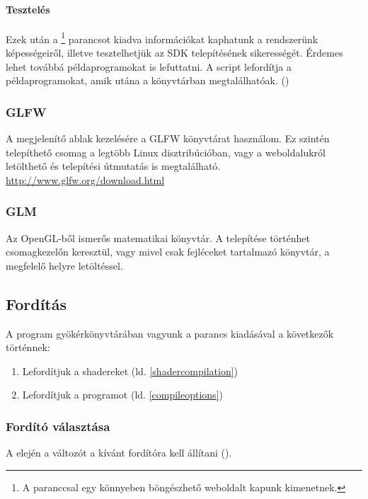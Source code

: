 \paragraph{Tesztel\'es}
Ezek ut\'an a \footnote{A  paranccsal egy k\"onnyeben b\"ong\'eszhet\H o weboldalt kapunk kimenetnek.} parancsot kiadva inform\'aci\'okat kaphatunk a rendszer\"unk k\'epess\'egeir\H ol, illetve tesztelhetj\"uk az SDK telep\'it\'es\'enek sikeress\'eg\'et. 
\'Erdemes lehet tov\'abb\'a p\'eldaprogramokat is lefuttatni. A  script leford\'itja a p\'eldaprogramokat, amik ut\'ana a  k\"onyvt\'arban megtal\'alhat\'oak. ()

\subsubsection{GLFW}
A megjelen\'it\H o ablak kezel\'es\'ere a GLFW k\"onyvt\'arat haszn\'alom. Ez szint\'en telep\'ithet\H o csomag a legt\"obb Linux disztrib\'uci\'oban, vagy a weboldalukr\'ol let\"olthet\H o \'es telep\'it\'esi \'utmutat\'as is megtal\'alhat\'o. \url{http://www.glfw.org/download.html}

\subsubsection{GLM}
Az OpenGL-b\H ol ismer\H os matematikai k\"onyvt\'ar. 
A telep\'it\'ese t\"ort\'enhet csomagkezel\H on kereszt\"ul, vagy mivel csak fejl\'eceket tartalmaz\'o k\"onyvt\'ar, a megfelel\H o helyre let\"olt\'essel.

\subsection{Ford\'it\'as}
A program gy\"ok\'erk\"onyvt\'ar\'aban vagyunk
a  parancs kiad\'as\'aval a k\"ovetkez\H ok t\"ort\'ennek:
\begin{enumerate}
	\item Leford\'itjuk a shadereket (ld. \ref{shadercompilation})
	\item Leford\'itjuk a programot (ld. \ref{compileoptions})
\end{enumerate}

\subsubsection{Ford\'it\'o v\'alaszt\'asa}
A  elej\'en a  v\'altoz\'ot a k\'iv\'ant ford\'it\'ora kell \'all\'itani ().
